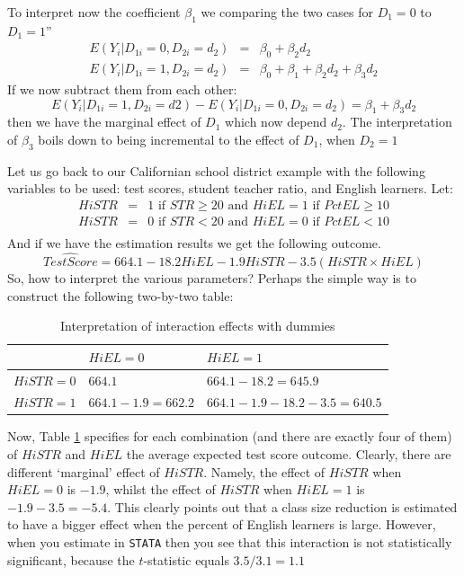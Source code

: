 \documentclass[
]{book}
\begin{document}
To interpret now the coefficient \(\beta_1\) we comparing the two cases for \(D_1=0\) to \(D_1=1\)''
\begin{eqnarray}
E(Y_i|D_{1i}=0, D_{2i}=d_2) &=& \beta_0 + \beta_2 d_2 \\
E(Y_i|D_{1i}=1, D_{2i}=d_2) &=& \beta_0 + \beta_1 + \beta_2 d_2 + \beta_3 d_2 
\end{eqnarray}
If we now subtract them from each other:
\begin{equation}
E(Y_i|D_{1i}=1, D_{2i}=d2) - E(Y_i|D_{1i}=0, D_{2i}=d_2) = \beta_1 + \beta_3 d_2
\end{equation}
then we have the marginal effect of \(D_1\) which now depend \(d_2\). The interpretation of \(\beta_3\) boils down to being incremental to the effect of \(D_1\), when \(D_2 = 1\)

Let us go back to our Californian school district example with the following variables to be used: test scores, student teacher ratio, and English learners. Let:
\begin{eqnarray}
HiSTR &=& 1 \text{ if } STR \geq 20 \text{ and } HiEL = 1 \text{ if }
PctEL \geq 10 \\
HiSTR &=& 0 \text{ if } STR < 20 \text{ and } HiEL = 0 \text{ if }
PctEL < 10 \\
\end{eqnarray}
And if we have the estimation results we get the following outcome.
\begin{equation}
\widehat{TestScore} = 664.1 - 18.2 HiEL - 1.9 HiSTR - 3.5(HiSTR \times
HiEL)
\end{equation}
So, how to interpret the various parameters? Perhaps the simple way is to construct the following two-by-two table:

\begin{table}

\caption{\label{tab:intdummies}Interpretation of interaction effects with dummies}
\centering
\begin{tabular}[t]{lll}
\toprule
 & $HiEL = 0$ & $HiEL = 1$\\
\midrule
$HiSTR = 0$ & $664.1$ & $664.1 - 18.2 = 645.9$\\
$HiSTR = 1$ & $664.1 - 1.9 = 662.2$ & $664.1 - 1.9 - 18.2 - 3.5= 640.5$\\
\bottomrule
\end{tabular}
\end{table}

Now, Table \ref{tab:intdummies} specifies for each combination (and there are exactly four of them) of \(HiSTR\) and \(HiEL\) the average expected test score outcome. Clearly, there are different `marginal' effect of \(HiSTR\). Namely, the effect of \(HiSTR\) when \(HiEL = 0\) is \(-1.9\), whilst the effect of \(HiSTR\) when \(HiEL = 1\) is \(-1.9 - 3.5 = -5.4\). This clearly points out that a class size reduction is estimated to have a bigger effect when the percent of English learners is large. However, when you estimate in \texttt{STATA} then you see that this interaction is not statistically significant, because the \(t\)-statistic equals \(3.5/3.1 = 1.1\)
\end{document}
